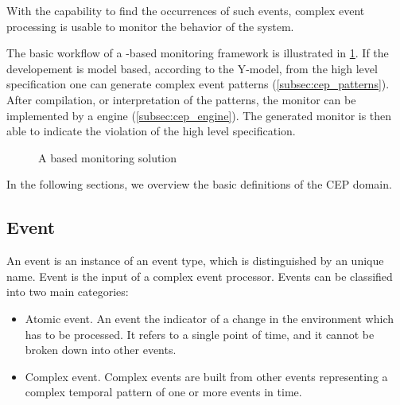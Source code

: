 With the capability to find the occurrences of such events, complex event processing is usable to monitor the behavior of the system.

The basic workflow of a \cep{}-based monitoring framework is illustrated in \cref{fig:cep_monitoring}. If the developement is model based, according to the Y-model, from the high level specification one can generate complex event patterns (\cref{subsec:cep_patterns}). After compilation, or interpretation of the patterns, the monitor can be implemented by a \cep{} engine (\cref{subsec:cep_engine}). The generated monitor is then able to indicate the violation of the high level specification.

\begin{figure}
	\centering
	\caption{A \cep{} based monitoring solution}
\label{fig:cep_monitoring}
\end{figure}

\noindent In the following sections, we overview the basic definitions of the CEP domain.

\subsection{Event}
\label{subsec:cep_event}

An event is an instance of an event type, which is distinguished by an unique name.
Event is the input of a complex event processor. Events can be classified into two main categories:
\begin{itemize}
	\item Atomic event. An event the indicator of a change in the environment which has to be processed. It refers to a single point of time, and it cannot be broken down into other events.
	\item Complex event. Complex events are built from other events representing a complex temporal pattern of one or more events in time.
\end{itemize}

